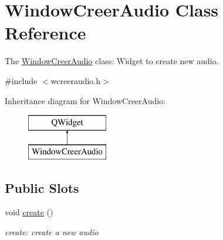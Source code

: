 \hypertarget{class_window_creer_audio}{}\section{Window\+Creer\+Audio Class Reference}
\label{class_window_creer_audio}


The \hyperlink{class_window_creer_audio}{Window\+Creer\+Audio} class\+: Widget to create new audio.  




{\ttfamily \#include $<$wcreeraudio.\+h$>$}

Inheritance diagram for Window\+Creer\+Audio\+:\begin{figure}[H]
\begin{center}
\leavevmode
\includegraphics[height=2.000000cm]{class_window_creer_audio}
\end{center}
\end{figure}
\subsection*{Public Slots}
\begin{DoxyCompactItemize}
\item 
\mbox{\label{class_window_creer_audio_aaf356899dc6e9892ce190d8dde9dfe33}} 
void \hyperlink{class_window_creer_audio_aaf356899dc6e9892ce190d8dde9dfe33}{create} ()
\begin{DoxyCompactList}\small\item\em create\+: create a new audio \end{DoxyCompactList}\end{DoxyCompactItemize}
